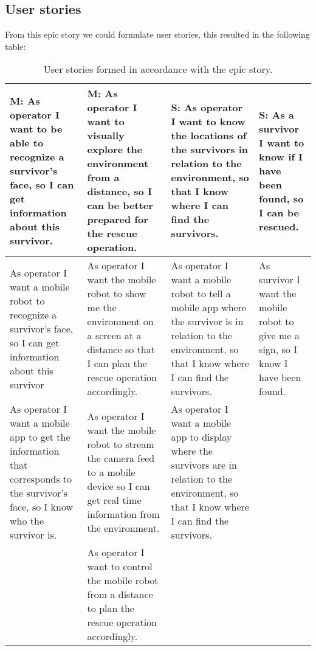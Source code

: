 \documentclass[12pt]{article}
\begin{document}
	 \subsection{User stories}
	 From this epic story we could formulate user stories, this resulted in the following table:
	 \begin{table}[htbp]
	 	\centering
	 	\begin{tabularx}{\linewidth}{|X|X|X|X|}
	 		\hline
	 		\textbf{M: As operator I want to be able to recognize a survivor's face, so I can get information about this survivor.}                                               &\textbf{M: As operator I want to visually explore the environment from a distance, so I can be better prepared for the rescue operation.}       &\textbf{S: As operator I want to know the locations of the survivors in relation to the environment, so that I know where I can find the survivors.}
	 		                                                        &\textbf{S: As a survivor I want to know if I have been found, so I can be rescued.}
	 		                                                                                    \tabularnewline \hline
	 		As operator I want a mobile robot to recognize a survivor's face, so I can get information about this survivor                                              &As operator I want the mobile robot to show me the environment on a screen at a distance so that I can plan the rescue operation accordingly.                                          &As operator I want a mobile robot to tell a mobile app where the survivor is in relation to the environment, so that I know where I can find the survivors.                                            &As survivor I want the mobile robot to give me a sign, so I know I have been found.
	 		\tabularnewline \hline
	 		As operator I want a mobile app to get the information that corresponds to the survivor's face, so I know who the survivor is.                                                   &As operator I want the mobile robot to stream the camera feed to a mobile device so I can get real time information from the environment.   &As operator I want a mobile app to display where the survivors are in relation to the environment, so that I know where I can find the survivors. &   \tabularnewline \hline
	 	                                               &As operator I want to control the mobile robot from a distance to plan the rescue operation accordingly.  & &
            \tabularnewline \hline
	 	\end{tabularx}
	 	\caption{User stories formed in accordance with the epic story.}
	 	\label{table:userStories}   
	 \end{table}
 	\FloatBarrier
\end{document}

